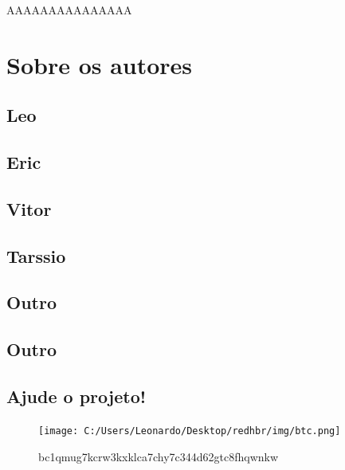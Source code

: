 \documentclass[
]{book}
\begin{document}
AAAAAAAAAAAAAAA

\hypertarget{sobre-os-autores}{%
\chapter{Sobre os autores}\label{sobre-os-autores}}

\hypertarget{leo}{%
\section{Leo}\label{leo}}

\hypertarget{eric}{%
\section{Eric}\label{eric}}

\hypertarget{vitor}{%
\section{Vitor}\label{vitor}}

\hypertarget{tarssio}{%
\section{Tarssio}\label{tarssio}}

\hypertarget{outro}{%
\section{Outro}\label{outro}}

\hypertarget{outro-1}{%
\section{Outro}\label{outro-1}}

\hypertarget{ajude-o-projeto}{%
\section{Ajude o projeto!}\label{ajude-o-projeto}}

\begin{figure}
\centering
\texttt{[image: C:/Users/Leonardo/Desktop/redhbr/img/btc.png]}
\caption{bc1qmug7kcrw3kxklca7chy7c344d62gtc8fhqwnkw}
\end{figure}

  
\end{document}
